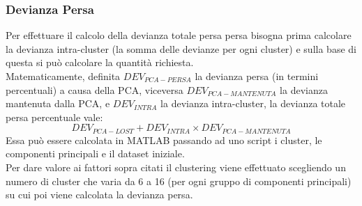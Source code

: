 \subsubsection{Devianza Persa}
Per effettuare il calcolo della devianza totale persa persa bisogna prima calcolare la devianza intra-cluster (la somma delle devianze per ogni cluster) e sulla base di questa si può calcolare la quantità richiesta.
\\Matematicamente, definita $DEV_{PCA-PERSA}$ la devianza persa (in termini percentuali) a causa della PCA, viceversa $DEV_{PCA-MANTENUTA}$ la devianza mantenuta dalla PCA, e $DEV_{INTRA}$ la devianza intra-cluster, la devianza totale persa percentuale vale:
\begin{equation*}
	DEV_{PCA-LOST} + DEV_{INTRA}\times DEV_{PCA-MANTENUTA}
\end{equation*}
Essa può essere calcolata in MATLAB passando ad uno script i cluster, le componenti principali e il dataset iniziale.
\\ Per dare valore ai fattori sopra citati il clustering viene effettuato scegliendo un numero di cluster che varia da 6 a 16 (per ogni gruppo di componenti principali) su cui poi viene calcolata la devianza persa.
\newpage
